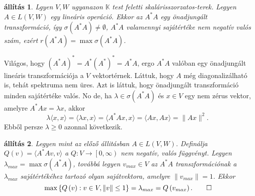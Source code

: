 \documentclass[9pt, a4paper, showtrims]{memoir}
\makeatletter
\renewenvironment{proof}[1][\proofname]
    {\par\pushQED{\qed}%
    \normalfont \topsep6\p@\@plus6\p@\relax
    \trivlist
    \item[\hskip\labelsep
        \itshape
    #1\@addpunct{:}]\ignorespaces}
    {\popQED\endtrivlist\@endpefalse}
\theoremstyle{plain}
\newtheorem{proposition}{állítás}[chapter]
\theoremstyle{remark}
\theoremstyle{definition}
\newcommand{\ip}[2]{\langle#1,#2\rangle}
\makeatother
\begin{document}
\begin{proposition}
    Lgyen $V,W$ ugyanazon $\mathbb{K}$ test feletti skalárisszorzatos-terek.
    Legyen $A\in L\left( V,W \right)$ egy lineáris operáció.
    Ekkor az $A^\ast A$ egy önadjungált transzformáció, 
    így $\sigma\left( A^\ast A \right)\neq \emptyset$,
    $A^\ast A$ valamennyi sajátértéke nem negatív valós szám, 
    ezért 
    $r\left( A^\ast A \right)=\max\sigma\left( A^\ast A \right)$.
\end{proposition}
\begin{proof}
    Világos, hogy $(A^\ast A)^\ast=A^\ast (A^\ast)^\ast=A^\ast A$, 
    ergo $A^\ast A$ valóban egy önadjungált lineáris transzformációja a $V$ vektortérnek.
    Láttuk, hogy $A$ még diagonalizálható is, tehát spektruma nem üres.
    Azt is láttuk, hogy önadjungált transzformáció minden sajátértéke valós.
    No de, ha $\lambda\in\sigma\left( A^\ast A \right)$ és $x\in V$ egy nem zérus vektor,
    amelyre $A^\ast Ax=\lambda x$, akkor
    \[
        \lambda\ip{x}{x}
        =
        \ip{\lambda x}{x}
        =
        \ip{A^\ast Ax}{x}
        =
        \ip{Ax}{Ax}
        =\|Ax\|^2.
        \
    \]
    Ebből persze $\lambda\geq 0$ azonnal következik.
\end{proof}
\begin{proposition}
    Legyen mint az előző állitásban $A\in L\left( V,W \right)$.
    Definálja $Q\left( v \right)=\ip{A^\ast Av}{v}$ a $Q:V\to\left[ 0,\infty \right)$ nem negatív, valós függvényt.
    Legyen $\lambda_{max}=\max\sigma\left( A^\ast A \right)$, 
    továbbá legyen 
    $v_{max}\in V$ az $A^\ast A$ transzformációnak a $\lambda_{max}$ sajátértékéhez tartozó olyan sajátvektora, 
    amelyre $\|v_{max}\|=1$.
    Ekkor 
    \[
        \max\left\{ Q\left( v \right):v\in V,\|v\|\leq 1 \right\}
        =
        \lambda_{max}
        =
        Q\left( v_{max} \right).
        \qedhere
    \]
\end{proposition}
\end{document}
